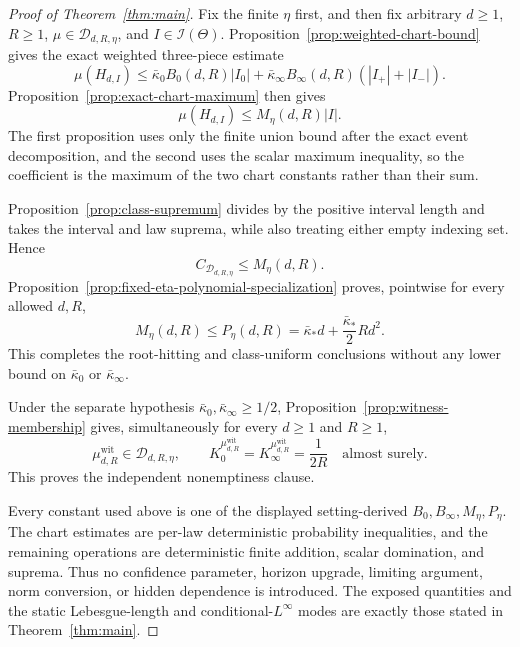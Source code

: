 \begin{proof}[Proof of Theorem~\ref{thm:main}]
Fix the finite $\eta$ first, and then fix arbitrary $d\geq1$, $R\geq1$,
$\mu\in\mathcal D_{d,R,\eta}$, and $I\in\mathcal I(\Theta)$.
Proposition~\ref{prop:weighted-chart-bound} gives the exact weighted
three-piece estimate
\[
\mu(H_{d,I})
\leq\bar\kappa_0B_0(d,R)|I_0|
 +\bar\kappa_\infty B_\infty(d,R)(|I_+|+|I_-|).
\]
Proposition~\ref{prop:exact-chart-maximum} then gives
\[
\mu(H_{d,I})\leq M_\eta(d,R)|I|.
\]
The first proposition uses only the finite union bound after the exact event
decomposition, and the second uses the scalar maximum inequality, so the
coefficient is the maximum of the two chart constants rather than their sum.

Proposition~\ref{prop:class-supremum} divides by the positive interval length
and takes the interval and law suprema, while also treating either empty
indexing set.  Hence
\[
C_{\mathcal D_{d,R,\eta}}\leq M_\eta(d,R).
\]
Proposition~\ref{prop:fixed-eta-polynomial-specialization} proves, pointwise
for every allowed $d,R$,
\[
M_\eta(d,R)\leq P_\eta(d,R)
=\bar\kappa_*d+\frac{\bar\kappa_*}{2}Rd^2.
\]
This completes the root-hitting and class-uniform conclusions without any
lower bound on $\bar\kappa_0$ or $\bar\kappa_\infty$.

Under the separate hypothesis
$\bar\kappa_0,\bar\kappa_\infty\geq1/2$,
Proposition~\ref{prop:witness-membership} gives, simultaneously for every
$d\geq1$ and $R\geq1$,
\[
\mu^{\mathrm{wit}}_{d,R}\in\mathcal D_{d,R,\eta},
\qquad
K_0^{\mu^{\mathrm{wit}}_{d,R}}
=K_\infty^{\mu^{\mathrm{wit}}_{d,R}}
=\frac1{2R}\quad\text{almost surely}.
\]
This proves the independent nonemptiness clause.

Every constant used above is one of the displayed setting-derived
$B_0,B_\infty,M_\eta,P_\eta$.  The chart estimates are per-law deterministic
probability inequalities, and the remaining operations are deterministic
finite addition, scalar domination, and suprema.  Thus no confidence
parameter, horizon upgrade, limiting argument, norm conversion, or hidden
dependence is introduced.  The exposed quantities and the static
Lebesgue-length and conditional-$L^\infty$ modes are exactly those stated in
Theorem~\ref{thm:main}.
\end{proof}
